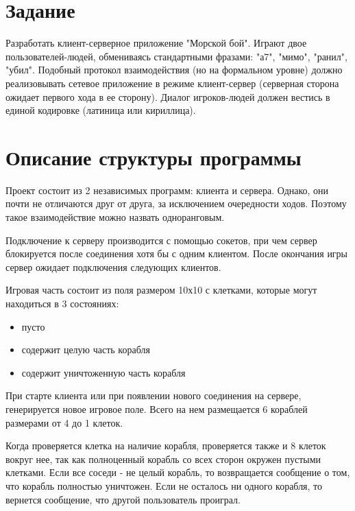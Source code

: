 \section*{Задание}

Разработать клиент-серверное приложение "Морской бой". Играют двое
пользователей-людей, обмениваясь стандартными фразами: "а7", "мимо", "ранил",
"убил". Подобный протокол взаимодействия (но на формальном уровне) должно
реализовывать сетевое приложение в режиме клиент-сервер (серверная сторона
ожидает первого хода в ее сторону). Диалог игроков-людей должен вестись в единой
кодировке (латиница или кириллица).

\newpage

\section*{Описание структуры программы}

Проект состоит из 2 независимых программ: клиента и сервера.
Однако, они почти не отличаются друг от друга, за исключением очередности ходов.
Поэтому такое взаимодействие можно назвать одноранговым.

Подключение к серверу производится с помощью сокетов, при чем сервер блокируется
после соединения хотя бы с одним клиентом. После окончания игры сервер ожидает
подключения следующих клиентов.

Игровая часть состоит из поля размером 10х10 с клетками, которые могут
находиться в 3 состояниях:

\begin{itemize}
    \item пусто
    \item содержит целую часть корабля
    \item содержит уничтоженную часть корабля
\end{itemize}

При старте клиента или при появлении нового соединения на сервере, генерируется
новое игровое поле. Всего на нем размещается 6 кораблей размерами от 4 до 1 клеток.

Когда проверяется клетка на наличие корабля, проверяется также и 8 клеток вокруг
нее, так как полноценный корабль со всех сторон окружен пустыми клетками. Если
все соседи - не целый корабль, то возвращается сообщение о том, что корабль
полностью уничтожен. Если не осталось ни одного корабля, то вернется сообщение,
что другой пользователь проиграл.

